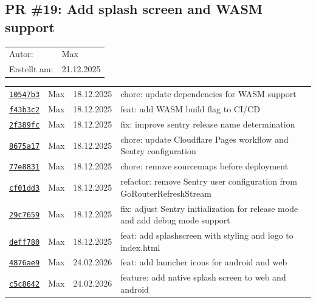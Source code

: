 \documentclass{article}%
\begin{document}
\subsection{PR \#19: Add splash screen and WASM support }%
\label{pr:19}%
\begin{tabular}{l l}%
Autor:&Max\\%
Erstellt am: &21.12.2025\\%
\end{tabular}%
\begin{longtable}{l l l p{12cm}}%
\href{https://github.com/scriptor1000/homeworks/pull/19/commits/10547b3ede95a731d7b4c9fe653cf2210135745c}{\underline{\texttt{10547b3}}}&Max&18.12.2025&chore: update dependencies for WASM support\\%
\href{https://github.com/scriptor1000/homeworks/pull/19/commits/f43b3c2607616414cd81afc4bb278163f77c7dda}{\underline{\texttt{f43b3c2}}}&Max&18.12.2025&feat: add WASM build flag to CI/CD\\%
\href{https://github.com/scriptor1000/homeworks/pull/19/commits/2f389fc0bff0167b5efb854faddbfa114e5c63fc}{\underline{\texttt{2f389fc}}}&Max&18.12.2025&fix: improve sentry release name determination\\%
\href{https://github.com/scriptor1000/homeworks/pull/19/commits/8675a17c259be5872dddbe7ba83826da31c3fb5d}{\underline{\texttt{8675a17}}}&Max&18.12.2025&chore: update Cloudflare Pages workflow and Sentry configuration\\%
\href{https://github.com/scriptor1000/homeworks/pull/19/commits/77e883141700e213003d4fd4a21f21e942d94289}{\underline{\texttt{77e8831}}}&Max&18.12.2025&chore: remove sourcemaps before deployment\\%
\href{https://github.com/scriptor1000/homeworks/pull/19/commits/cf01dd3004f2ee6b60271e6005bfd5867932ee72}{\underline{\texttt{cf01dd3}}}&Max&18.12.2025&refactor: remove Sentry user configuration from GoRouterRefreshStream\\%
\href{https://github.com/scriptor1000/homeworks/pull/19/commits/29c7659ee488ac9344fc55b73c3f5112d832bc5c}{\underline{\texttt{29c7659}}}&Max&18.12.2025&fix: adjust Sentry initialization for release mode and add debug mode support\\%
\href{https://github.com/scriptor1000/homeworks/pull/19/commits/deff780c17cfa4a128fee34ec0929f3582f343ca}{\underline{\texttt{deff780}}}&Max&18.12.2025&feat: add splashscreen with styling and logo to index.html\\%
\href{https://github.com/scriptor1000/homeworks/pull/19/commits/4876ae99902e1fc785d86c7e812dd35b3f7ebb93}{\underline{\texttt{4876ae9}}}&Max&24.02.2026&feat: add launcher icons for android and web\\%
\href{https://github.com/scriptor1000/homeworks/pull/19/commits/c5c86429d568e852beadcbd941e66b1c36c384ad}{\underline{\texttt{c5c8642}}}&Max&24.02.2026&feature: add native splash screen to web and android\\%
\end{longtable}
\end{document}
